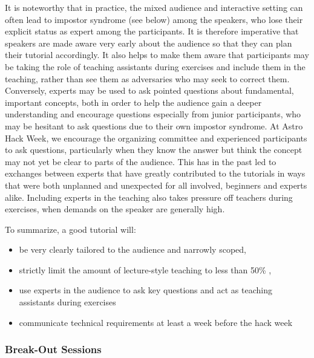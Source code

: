 It is noteworthy that in practice, the mixed audience and interactive setting can often lead to impostor syndrome (see below) among the speakers, who lose their explicit status as expert among the participants. It is therefore imperative that speakers are made aware very early about the audience so that they can plan their tutorial accordingly. It also helps to make them aware that participants may be taking the role of teaching assistants during exercises and include them in the teaching, rather than see them as adversaries who may seek to correct them. Conversely, experts may be used to ask pointed questions about fundamental, important concepts, both in order to help the audience gain a deeper understanding and encourage questions especially from junior participants, who may be hesitant to ask questions due to their own impostor syndrome. At Astro Hack Week, we encourage the organizing committee and experienced participants to ask questions, particularly when they know the answer but think the concept may not yet be clear to parts of the audience. This has in the past led to exchanges between experts that have greatly contributed to the tutorials in ways that were both unplanned and unexpected for all involved, beginners and experts alike. Including experts in the teaching also takes pressure off teachers during exercises, when demands on the speaker are generally high.

To summarize, a good tutorial will:
\begin{itemize}
\item be very clearly tailored to the audience and narrowly scoped,
\item strictly limit the amount of lecture-style teaching to less than 50\% ,
\item use experts in the audience to ask key questions and act as teaching assistants during exercises
\item communicate technical requirements at least a week before the hack week
\end{itemize}

\subsubsection{Break-Out Sessions}

